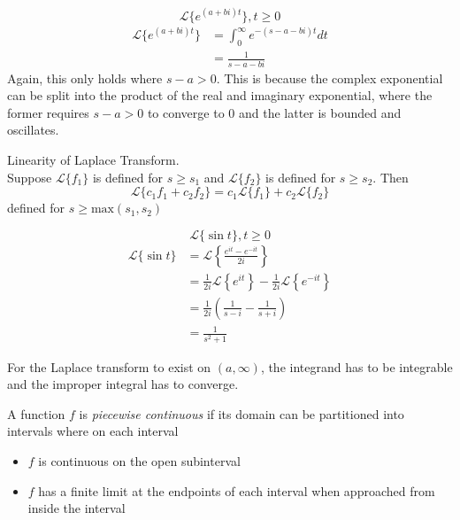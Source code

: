 \documentclass[12pt]{article}
\begin{document}
\begin{ex}
	$$\mathcal{L}\{e^{(a+bi)t}\}, t\geq 0$$
	\begin{align*}
		\mathcal{L}\{e^{(a+bi)t}\} &= \int_0^\infty e^{-(s-a-bi)t} dt \\
					   &= \frac{1}{s-a-bi}
	\end{align*}
	Again, this only holds where $s-a>0$. This is because the complex exponential can be split into the product of the real and imaginary exponential, where the former requires $s-a>0$ to converge to 0 and the latter is bounded and oscillates.
\end{ex}

\begin{thm}
	Linearity of Laplace Transform. \\
	Suppose $\mathcal{L}\{f_1\}$ is defined for $s\geq s_1$ and $\mathcal{L}\{f_2\}$ is defined for $s\geq s_2$. Then
	$$\mathcal{L}\{c_1f_1 + c_2f_2\} = c_1\mathcal{L}\{f_1\} + c_2\mathcal{L}\{f_2\}$$
	defined for $s\geq\text{max}(s_1,s_2)$
\end{thm}

\begin{ex}
	$$\mathcal{L}\{\sin t\}, t\geq 0$$
	\begin{align*}
		\mathcal{L}\{\sin t\} &= \mathcal{L}\left\{\frac{e^{it} - e^{-it}}{2i}\right\} \\
				      &= \frac{1}{2i}\mathcal{L}\left\{e^{it}\right\} - \frac{1}{2i}\mathcal{L}\left\{e^{-it}\right\} \\
				      &= \frac{1}{2i}\left(\frac{1}{s-i} - \frac{1}{s+i}\right) \\
				      &= \frac{1}{s^2+1}
	\end{align*}
\end{ex}

For the Laplace transform to exist on $(a,\infty)$, the integrand has to be integrable and the improper integral has to converge.

\begin{defn}
	A function $f$ is \emph{piecewise continuous} if its domain can be partitioned into intervals where on each interval
	\begin{itemize}
		\item $f$ is continuous on the open subinterval
		\item $f$ has a finite limit at the endpoints of each interval when approached from inside the interval
	\end{itemize}
\end{defn}
\end{document}
